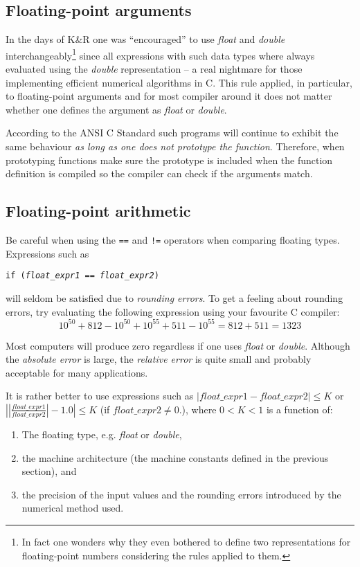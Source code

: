 \subsection{Floating-point arguments}

In the days of K\&R{\cite{kn:KR}} one was ``encouraged'' to use
{\em float} and {\em double} \linebreak
 interchangeably{\footnote{In fact one wonders
why they even bothered to define two representations for floating-point numbers
considering the rules applied to them.}} since all expressions with
such data types where always evaluated using the {\em double} representation
-- a real nightmare for those implementing efficient numerical algorithms
in C. This rule applied, in particular, to floating-point arguments and
for most compiler around it does not matter whether one defines the argument
as {\em float} or {\em double}.

According to the ANSI C Standard such programs will continue to exhibit the same
behaviour {\em as long as one does not prototype the function}. Therefore, when
prototyping functions make sure the prototype is included when the function
definition is compiled so the compiler can check if the arguments match.

\subsection{Floating-point arithmetic}

Be careful when using the {\tt ==} and {\tt !=} operators when comparing
floating types. Expressions such as
\begin{center}
{\tt if ({\em float\_expr1} == {\em float\_expr2})}
\end{center}
will seldom be satisfied due to {\em rounding errors}.
To get a feeling about rounding errors, try evaluating the following
expression using your favourite C compiler\cite{kn:fparith}:
\[
10^{50} + 812 - 10^{50} + 10^{55} + 511 - 10^{55} = 812 + 511 = 1323
\]

Most computers will produce zero regardless if one uses {\em float} or
{\em double}. Although the {\em absolute error} is large, the {\em relative
error} is quite small and probably acceptable for many applications.

It is rather better to use expressions such as
 $\left| float\_expr1 - float\_expr2 \right| \leq K$ or
 $\left| \left| \frac{float\_expr1}{float\_expr2} \right| - 1.0 \right| \leq K$
 (if $float\_expr2 \neq 0.$), where $0 < K < 1$ is
a function of:
\begin{enumerate}
\item The floating type, e.g. {\em float} or {\em double},
\item the machine architecture (the machine constants defined in the
 previous section), and
\item the precision of the input values and the rounding errors introduced
 by the numerical method used.
\end{enumerate}

